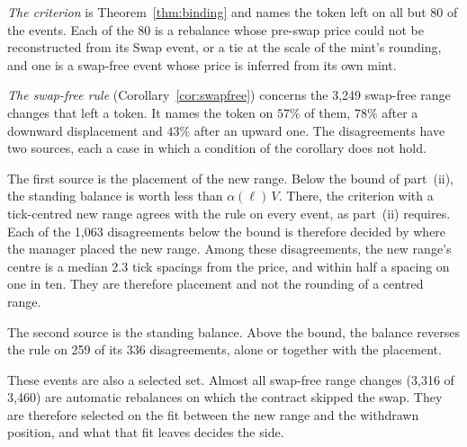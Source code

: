 \documentclass[11pt,a4paper]{article}
\theoremstyle{siphon}
\begin{document}
\emph{The criterion} is Theorem~\ref{thm:binding} and names the token left on all but 80 of the events. Each of the 80 is a rebalance whose pre-swap price could not be reconstructed from its Swap event, or a tie at the scale of the mint's rounding, and one is a swap-free event whose price is inferred from its own mint.

\emph{The swap-free rule} (Corollary~\ref{cor:swapfree}) concerns the 3{,}249 swap-free range changes that left a token. It names the token on $57\%$ of them, $78\%$ after a downward displacement and $43\%$ after an upward one. The disagreements have two sources, each a case in which a condition of the corollary does not hold.

The first source is the placement of the new range. Below the bound of part~(ii), the standing balance is worth less than $\alpha(\ell)\,V$. There, the criterion with a tick-centred new range agrees with the rule on every event, as part~(ii) requires. Each of the 1{,}063 disagreements below the bound is therefore decided by where the manager placed the new range. Among these disagreements, the new range's centre is a median 2.3 tick spacings from the price, and within half a spacing on one in ten. They are therefore placement and not the rounding of a centred range.

The second source is the standing balance. Above the bound, the balance reverses the rule on 259 of its 336 disagreements, alone or together with the placement.

These events are also a selected set. Almost all swap-free range changes (3{,}316 of 3{,}460) are automatic rebalances on which the contract skipped the swap. They are therefore selected on the fit between the new range and the withdrawn position, and what that fit leaves decides the side.
\end{document}
